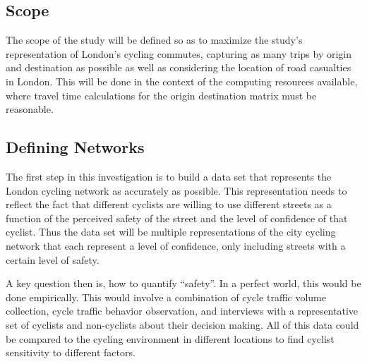 


\subsection{Scope}

The scope of the study will be defined so as to maximize the study's representation of London's cycling commutes, capturing as many trips by origin and destination as possible as well as considering the location of road casualties in London. This will be done in the context of the computing resources available, where travel time calculations for the origin destination matrix must be reasonable. 

\subsection{Defining Networks}

The first step in this investigation is to build a data set that represents the London cycling network as accurately as possible. This representation needs to reflect the fact that different cyclists are willing to use different streets as a function of the perceived safety of the street and the level of confidence of that cyclist. Thus the data set will be multiple representations of the city cycling network that each represent a level of confidence, only including streets with a certain level of safety. 


A key question then is, how to quantify ``safety''. In a perfect world, this would be done empirically. This would involve a combination of cycle traffic volume collection, cycle traffic behavior observation, and interviews with a representative set of cyclists and non-cyclists about their decision making. All of this data could be compared to the cycling environment in different locations to find cyclist sensitivity to different factors. 

